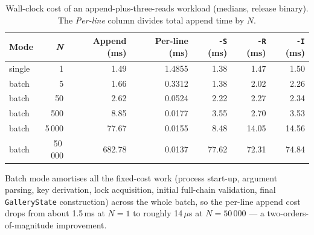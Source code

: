 \documentclass[a4paper, 12pt]{article}
\begin{document}
    \begin{table}[H]
        \centering
        \begin{tabular}{lrrrrrr}
            \toprule
            \textbf{Mode} & \textbf{\textit{N}} & \textbf{Append (ms)} & \textbf{Per-line (ms)} & \textbf{\texttt{-S} (ms)} & \textbf{\texttt{-R} (ms)} & \textbf{\texttt{-I} (ms)} \\
            \midrule
            single & 1       &   1.49 & 1.4855 &  1.38 &  1.47 &  1.50 \\
            batch  & 5       &   1.66 & 0.3312 &  1.38 &  2.02 &  2.26 \\
            batch  & 50      &   2.62 & 0.0524 &  2.22 &  2.27 &  2.34 \\
            batch  & 500     &   8.85 & 0.0177 &  3.55 &  2.70 &  3.53 \\
            batch  & 5\,000  &  77.67 & 0.0155 &  8.48 & 14.05 & 14.56 \\
            batch  & 50\,000 & 682.78 & 0.0137 & 77.62 & 72.31 & 74.84 \\
            \bottomrule
        \end{tabular}
        \caption{Wall-clock cost of an append-plus-three-reads workload (medians, release binary). The \emph{Per-line} column divides total append time by $N$.}
        \label{tab:perf-empirical}
    \end{table}

    Batch mode amortises all the fixed-cost work (process start-up, argument parsing, key derivation, lock acquisition, initial full-chain validation, final \texttt{GalleryState} construction) across the whole batch, so the per-line append cost drops from about 1.5\,ms at $N = 1$ to roughly 14\,$\mu$s at $N = 50\,000$ --- a two-orders-of-magnitude improvement.
\end{document}
